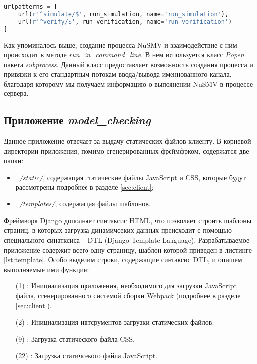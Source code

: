 \begin{lstlisting}[language=Python, 
			   	   label=lst:url_assign, 
				   caption={Фрагмент файла urls.py.}]
urlpatterns = [
	url(r'^simulate/$', run_simulation, name='run_simulation'),
	url(r'^verify/$', run_verification, name='run_verification')
]
\end{lstlisting}

Как упоминалось выше, создание процесса NuSMV и взаимодействие с ним происходит в методе \textit{run\_in\_command\_line}. В нем используется класс \textit{Popen} пакета \textit{subprocess}. Данный класс предоставляет возможность создания процесса и привязки к его стандартным потокам ввода/вывода именнованного канала, благодаря которому мы получаем информацию о выполнении NuSMV в процессе сервера.

\subsection{Приложение \textit{model\_checking}}

Данное приложение отвечает за выдачу статических файлов клиенту. В корневой директории приложения, помимо сгенерированных фреймфрком, содержатся две папки:

\begin{itemize}
	\item \textit{~/static/}, содержащая статические файлы JavaScript и CSS, которые будут рассмотрены подробнее в разделе \ref{sec:client};
	\item \textit{~/templates/}, содержащая файлы шаблонов.
\end{itemize} 

Фреймворк Django дополняет синтаксис HTML, что позволяет строить шаблоны страниц, в которых загрузка динамичсеких данных происходит с помощью специального синатксиса -- DTL (Django Template Language). Разрабатываемое приложение содержит всего одну страницу, шаблон которой приведен в листинге \ref{lst:template}. Особо выделим строки, содержащие синтаксис DTL, и опишем выполняемые ими функции:

\begin{itemize}
	\item [(1)]: Инициализация приложения, необходимого для загрузки JavaScript файла, сгенерированного системой сборки Webpack (подробнее в разделе \ref{sec:client}).
	\item [(2)]: Инициализация интсрументов загрузки статических файлов.
	\item [(9)]: Загрузка статического файла CSS.
	\item [(22)]: Загрузка статичсекого файла JavaScript.
\end{itemize}

